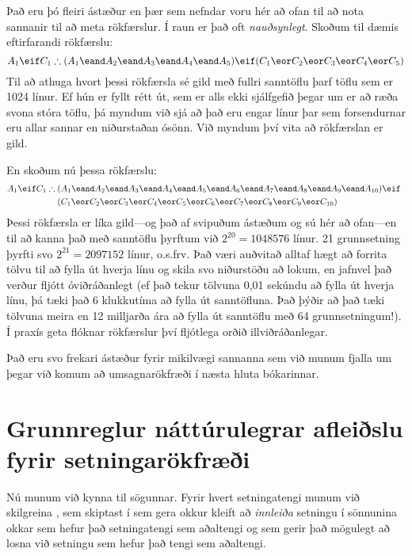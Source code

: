 Það eru þó fleiri ástæður en þær sem nefndar voru hér að ofan til að nota sannanir til að meta rökfærslur. Í raun er það oft \emph{nauðsynlegt}. Skoðum til dæmis eftirfarandi rökfærslu:
$$A_1 \eif C_1 \therefore (A_1 \eand A_2 \eand A_3 \eand A_4 \eand A_5) \eif (C_1 \eor C_2 \eor C_3 \eor C_4 \eor C_5)$$
Til að athuga hvort þessi rökfærsla sé gild með fullri sanntöflu þarf töflu sem er 1024 línur. Ef hún er fyllt rétt út, sem er alls ekki sjálfgefið þegar um er að ræða svona stóra töflu, þá myndum við sjá að það eru engar línur þar sem forsendurnar eru allar sannar en niðurstaðan ósönn. Við myndum því vita að rökfærslan er gild.

En skoðum nú þessa rökfærslu:
\begin{align*}
A_1 \eif C_1 \therefore {}& (A_1 \eand A_2 \eand A_3 \eand A_4 \eand A_5 \eand A_6 \eand A_7 \eand A_8 \eand A_9 \eand A_{10}) \eif \phantom{(}\\
&(C_1 \eor C_2 \eor C_3 \eor C_4 \eor C_5 \eor C_6 \eor C_7 \eor C_8 \eor C_9 \eor C_{10})
\end{align*}
Þessi rökfærsla er líka gild---og það af svipuðum ástæðum og sú hér að ofan---en til að kanna það með sanntöflu þyrftum við $2^{20} = 1048576$ línur. 21 grunnsetning þyrfti svo $2^{21} = 2097152$ línur, o.s.frv. Það væri auðvitað alltaf hægt að forrita tölvu til að fylla út hverja línu og skila svo niðurstöðu að lokum, en jafnvel það verður fljótt óviðráðanlegt (ef það tekur tölvuna 0,01 sekúndu að fylla út hverja línu, þá tæki það 6 klukkutíma að fylla út sanntöfluna. Það þýðir að það tæki tölvuna meira en 12 milljarða ára að fylla út sanntöflu með 64 grunnsetningum!). Í praxís geta flóknar rökfærslur því fljótlega orðið illviðráðanlegar.

Það eru svo frekari ástæður fyrir mikilvægi sannanna sem við munum fjalla um þegar við komum að umsagnarökfræði í næsta hluta bókarinnar.

\chapter{Grunnreglur náttúrulegrar afleiðslu fyrir setningarökfræði}\label{s:BasicTFL}

Nú munum við kynna  til sögunnar. Fyrir hvert setningatengi munum við skilgreina , sem skiptast í  sem gera okkur kleift að \emph{innleiða} setningu í sönnunina okkar sem hefur það setningatengi sem aðaltengi og  sem gerir það mögulegt að losna við setningu sem hefur það tengi sem aðaltengi.

